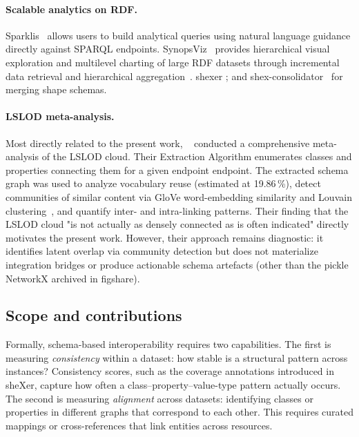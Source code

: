 \documentclass[12pt]{article}
\begin{document}
\paragraph*{Scalable analytics on RDF.}


Sparklis~\cite{ferre_sparklis_2016} allows users to build analytical queries using natural language guidance directly against SPARQL endpoints. %
SynopsViz~\cite{bikakis_rdfsynopsviz_2014} provides hierarchical visual exploration and multilevel charting of large RDF datasets through incremental data
retrieval and hierarchical aggregation~\cite{papadaki_brief_2023}.
shexer \cite{shexer}; and shex-consolidator~\cite{fernandez-alvarez_extracting_2024} for merging shape schemas.
\paragraph*{LSLOD meta-analysis.}
Most directly related to the present work, ~\cite{kamdar_empirical_2021} conducted a comprehensive meta-analysis
of the LSLOD cloud.
Their Extraction Algorithm enumerates classes and properties connecting them for a given endpoint endpoint.
The extracted schema graph was used to analyze vocabulary reuse
(estimated at 19.86\,\%), detect communities of similar content via
GloVe word-embedding similarity and Louvain
clustering~\cite{kamdar_empirical_2021}, and quantify inter- and intra-linking patterns.
Their finding that the LSLOD cloud "is not actually as densely connected as is often indicated" directly motivates the present work.
However, their approach remains diagnostic: it identifies latent overlap via community detection but does not materialize integration bridges or produce actionable schema artefacts (other than the pickle NetworkX archived in figshare).

\subsection{Scope and contributions}

Formally, schema-based interoperability requires two capabilities.
The first is measuring \emph{consistency} within a dataset: how stable
is a structural pattern across instances?
Consistency scores, such as the coverage annotations introduced in
sheXer, capture how often a class--property--value-type pattern actually
occurs.
The second is measuring \emph{alignment} across datasets: identifying
classes or properties in different graphs that correspond to each other.
This requires curated mappings or cross-references that link entities
across resources.
\end{document}
